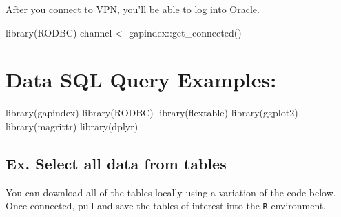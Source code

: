 \documentclass[
  letterpaper,
  oneside,
  open=any]{scrbook}
\newenvironment{Shaded}{\begin{snugshade}}{\end{snugshade}}
\newcommand{\FunctionTok}[1]{\textcolor[rgb]{0.28,0.35,0.67}{#1}}
\newcommand{\NormalTok}[1]{\textcolor[rgb]{0.00,0.23,0.31}{#1}}
\newcommand{\OtherTok}[1]{\textcolor[rgb]{0.00,0.23,0.31}{#1}}
\newcommand{\SpecialCharTok}[1]{\textcolor[rgb]{0.37,0.37,0.37}{#1}}
\begin{document}
After you connect to VPN, you'll be able to log into Oracle.

\begin{Shaded}
\begin{Highlighting}[]
\FunctionTok{library}\NormalTok{(RODBC)}
\NormalTok{channel }\OtherTok{\textless{}{-}}\NormalTok{ gapindex}\SpecialCharTok{::}\FunctionTok{get\_connected}\NormalTok{()}
\end{Highlighting}
\end{Shaded}

\section*{Data SQL Query Examples:}\label{data-sql-query-examples}


\begin{Shaded}
\begin{Highlighting}[]
\FunctionTok{library}\NormalTok{(gapindex)}
\FunctionTok{library}\NormalTok{(RODBC)}
\FunctionTok{library}\NormalTok{(flextable)}
\FunctionTok{library}\NormalTok{(ggplot2)}
\FunctionTok{library}\NormalTok{(magrittr)}
\FunctionTok{library}\NormalTok{(dplyr)}
\end{Highlighting}
\end{Shaded}

\subsection{Ex. Select all data from
tables}\label{ex.-select-all-data-from-tables}

You can download all of the tables locally using a variation of the code
below. Once connected, pull and save the tables of interest into the
\texttt{R} environment.
\end{document}
